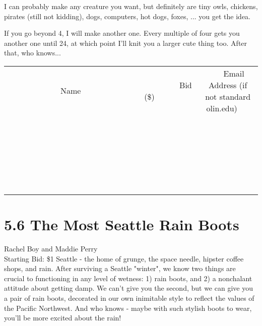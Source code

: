 \documentclass[11pt]{article}
\begin{document}
I can probably make any creature you want, but definitely are tiny owls, chickens, pirates (still not kidding), dogs, computers, hot dogs, foxes, ... you get the idea. 

If you go beyond 4, I will make another one. Every multiple of four gets you another one until 24, at which point I'll knit you a larger cute thing too. After that, who knows...
\\[6ex]
\begin{tabular}{c c c}
~~~~~~~~~~~~~Name~~~~~~~~~~~~~ & ~~~~~~~~~Bid (\$)~~~~~~~~~  & ~~~Email Address (if not standard olin.edu)~~~\\
 & & \\
\hline
 & & \\
\hline
 & & \\
\hline
 & & \\
\hline
 & & \\
\hline
 & & \\
\hline
 & & \\
\hline
 & & \\
\hline
 & & \\
\hline
 & & \\
\hline
 & & \\
\hline
 & & \\
\hline
 & & \\
\hline
 & & \\
\hline
 & & \\
\hline
 & & \\
\hline
 & & \\
\hline
 & & \\
\hline
 & & \\
\hline
 & & \\
\hline
 & & \\
\hline
 & & \\
\hline
 & & \\
\hline
 & & \\
\hline
 & & \\
\hline
 & & \\
\hline
\end{tabular}
\newpage
\section*{5.6 The Most Seattle Rain Boots}
Rachel Boy and Maddie Perry
\\
Starting Bid: \$1
\newline
Seattle - the home of grunge, the space needle, hipster coffee shops, and rain. After surviving a Seattle "winter", we know two things are crucial to functioning in any level of wetness: 1) rain boots, and 2) a nonchalant attitude about getting damp. We can't give you the second, but we can give you a pair of rain boots, decorated in our own inimitable style to reflect the values of the Pacific Northwest. And who knows - maybe with such stylish boots to wear, you'll be more excited about the rain!
\end{document}
